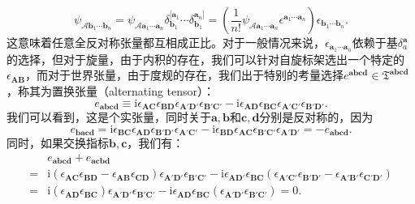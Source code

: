 \begin{equation*}
	\psi _{\mathcal{A}\boldsymbol{b}_{1} \cdots \boldsymbol{b}_{n}} =\psi _{\mathcal{A}\boldsymbol{a}_{1} \cdots \boldsymbol{a}_{n}} \delta _{\boldsymbol{b}_{1}}^{[\boldsymbol{a}_{1}} \cdots \delta _{\boldsymbol{b}_{1}}^{\boldsymbol{a}_{n}]} =\left(\frac{1}{n!} \psi _{\mathcal{A}\boldsymbol{a}_{1} \cdots \boldsymbol{a}_{n}} \epsilon ^{\boldsymbol{a}_{1} \cdots \boldsymbol{a}_{n}}\right) \epsilon _{\boldsymbol{b}_{1} \cdots \boldsymbol{b}_{n}} .
\end{equation*}
这意味着任意全反对称张量都互相成正比。对于一般情况来说，$\epsilon _{\boldsymbol{a}_{1} \cdots \boldsymbol{a}_{n}}$依赖于基$\delta _{a}^{\boldsymbol{a}}$的选择，但对于旋量，由于内积的存在，我们可以针对自旋标架选出一个特定的$\epsilon _{\boldsymbol{AB}}$，而对于世界张量，由于度规的存在，我们出于特别的考量选择$e^{\boldsymbol{abcd}} \in \mathfrak{T}^{\boldsymbol{abcd}}$，称其为置换张量（alternating tensor）：
\begin{equation}
	e_{\boldsymbol{abcd}} \equiv \mathrm{i} \epsilon \boldsymbol{_{AC}} \epsilon \boldsymbol{_{BD}} \epsilon _{\boldsymbol{A'D} '} \epsilon _{\boldsymbol{B} '\boldsymbol{C} '} -\mathrm{i} \epsilon _{\boldsymbol{AD}} \epsilon _{\boldsymbol{BC}} \epsilon \boldsymbol{_{A'C'}} \epsilon \boldsymbol{_{B'D'}} .
	\label{eq:4.16}
\end{equation}
我们可以看到，这是个实张量，同时关于$\boldsymbol{a} ,\boldsymbol{b}$和$\boldsymbol{c} ,\boldsymbol{d}$分别是反对称的，因为
\begin{equation*}
	e_{\boldsymbol{bacd}} =\mathrm{i} \epsilon _{\boldsymbol{BC}} \epsilon _{\boldsymbol{AD}} \epsilon \boldsymbol{_{B'D'}} \epsilon \boldsymbol{_{A'C'}} -\mathrm{i} \epsilon \boldsymbol{_{BD}} \epsilon \boldsymbol{_{AC}} \epsilon _{\boldsymbol{B} '\boldsymbol{C} '} \epsilon _{\boldsymbol{A'D} '} =-e_{\boldsymbol{abcd}} .
\end{equation*}
同时，如果交换指标$\boldsymbol{b} ,\boldsymbol{c}$，我们有：
\begin{equation*}
	\begin{aligned}
		& e_{\boldsymbol{abcd}} +e_{\boldsymbol{acbd}}\\
		= & \mathrm{i}( \epsilon _{\boldsymbol{AC}} \epsilon _{\boldsymbol{BD}} -\epsilon _{\boldsymbol{AB}} \epsilon _{\boldsymbol{CD}}) \epsilon _{\boldsymbol{A} '\boldsymbol{D} '} \epsilon _{\boldsymbol{B} '\boldsymbol{C} '} -\mathrm{i} \epsilon _{\boldsymbol{AD} '} \epsilon _{\boldsymbol{BC}}( \epsilon _{\boldsymbol{A} '\boldsymbol{C} '} \epsilon _{\boldsymbol{B} '\boldsymbol{D} '} -\epsilon _{\boldsymbol{A} '\boldsymbol{B} '} \epsilon _{\boldsymbol{C} '\boldsymbol{D} '})\\
		= & \mathrm{i}( \epsilon _{\boldsymbol{AD}} \epsilon _{\boldsymbol{BC}}) \epsilon _{\boldsymbol{A} '\boldsymbol{D} '} \epsilon _{\boldsymbol{B} '\boldsymbol{C} '} -\mathrm{i} \epsilon _{\boldsymbol{AD}} \epsilon _{\boldsymbol{BC}}( \epsilon _{\boldsymbol{A} '\boldsymbol{D} '} \epsilon _{\boldsymbol{B} '\boldsymbol{C} '}) =0.
	\end{aligned}
\end{equation*}
